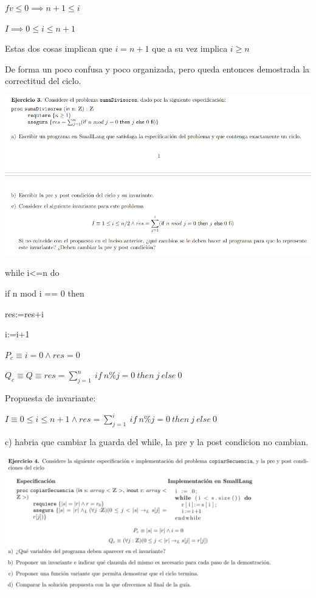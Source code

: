 \documentclass[a4paper,10pt]{article}
\begin{document}
$fv\leq 0 \implies n+1\leq i$

$I\implies 0\leq i\leq n+1$

    Estas dos cosas implican que $i=n+1$ que a su vez implica $i\geq n$

    De forma un poco confusa y poco organizada, pero queda entonces demostrada la correctitud del ciclo.

    \pagebreak

    \includegraphics*[width=\textwidth]{./e3.png}

    while i<=n do

    if n mod i == 0 then

    res:=res+i

    i:=i+1

$P_c\equiv i=0 \land res=0$

$Q_c \equiv Q \equiv res=\sum_{j=1}^{n}\ if\ n\%j=0\ then\ j\ else\ 0$

    Propuesta de invariante:

$I\equiv 0\leq i\leq n+1 \land res=\sum_{j=1}^{i}\ if\ n\%j=0\ then\ j\ else\ 0$

    c) habria que cambiar la guarda del while, la pre y la post condicion no cambian.

    \pagebreak

    \includegraphics*[width=\textwidth]{e4.png}
\end{document}
